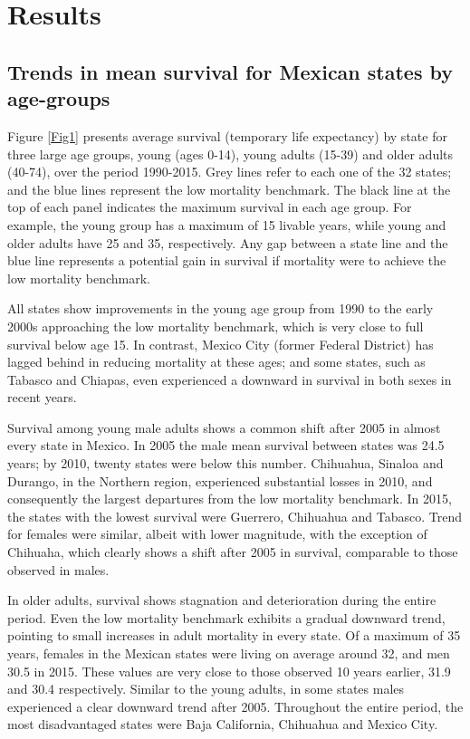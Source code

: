 \documentclass{bmcart}
\begin{document}
\section*{Results}

\subsection*{Trends in mean survival for Mexican states by age-groups}

Figure \ref{Fig1} presents average survival (temporary life expectancy) by state  for three large age groups, young (ages 0-14), young adults (15-39) and older adults (40-74), over the period 1990-2015. Grey lines refer to each one of the 32 states; and the blue lines represent the low mortality benchmark. The black line at the top of each panel indicates the maximum survival in each age group. For example, the young group has a maximum of 15 livable years, while young and older adults have 25 and 35, respectively. Any gap between a state line and the blue line represents a potential gain in survival if mortality were to achieve the low mortality benchmark.

All states show improvements in the young age group from 1990 to the early 2000s approaching the low mortality benchmark, which is very close to full survival below age 15. In contrast, Mexico City (former Federal District) has lagged behind in reducing mortality at these ages; and some states, such as Tabasco and Chiapas, even experienced a downward in survival in both sexes in recent years.

Survival among young male adults shows a common shift after 2005 in almost every state in Mexico. In 2005 the male mean survival between states was 24.5 years; by 2010, twenty states were below this number. Chihuahua, Sinaloa and Durango, in the Northern region, experienced substantial losses in 2010, and consequently the largest departures from the low mortality benchmark. In 2015, the states with the lowest survival were Guerrero, Chihuahua and Tabasco. Trend for females were similar, albeit with lower magnitude, with the exception of Chihuaha, which clearly shows a shift after 2005 in survival, comparable to those observed in males.

In older adults, survival shows stagnation and deterioration during the entire period. Even the low mortality benchmark exhibits a gradual downward trend, pointing to small increases in adult mortality in every state. Of a maximum of 35 years, females in the Mexican states were living on average around 32, and men 30.5 in 2015. These values are very close to those observed 10 years earlier, 31.9 and 30.4 respectively. Similar to the young adults, in some states males experienced a  clear downward trend after 2005. Throughout the entire period, the most disadvantaged states were Baja California, Chihuahua and Mexico City. \\
\end{document}
